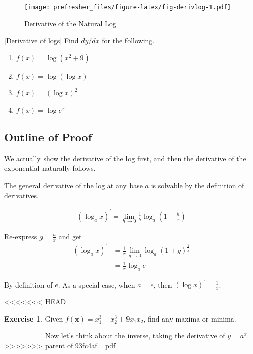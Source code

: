 \documentclass[]{book}
\providecommand{\tightlist}{%
  \setlength{\itemsep}{0pt}\setlength{\parskip}{0pt}}
\theoremstyle{definition}
\theoremstyle{definition}
\theoremstyle{definition}
\newtheorem{exercise}{Exercise}[chapter]
\theoremstyle{remark}
\begin{document}
\begin{figure}
\centering
\texttt{[image: prefresher\_files/figure-latex/fig-derivlog-1.pdf]}
\caption{\label{fig:fig-derivlog}Derivative of the Natural Log}
\end{figure}

[Derivative of logs]
\protect\hypertarget{exm:exmderivlog}{}{\label{exm:exmderivlog} {} }Find \(dy/dx\) for the following.

\begin{enumerate}
\def\labelenumi{\arabic{enumi}.}
\tightlist
\item
  \(f(x)=\log(x^2+9)\)
\item
  \(f(x)=\log(\log x)\)
\item
  \(f(x)=(\log x)^2\)
\item
  \(f(x)=\log e^x\)
\end{enumerate}

\hypertarget{outline-of-proof}{%
\subsection*{Outline of Proof}\label{outline-of-proof}}

We actually show the derivative of the log first, and then the derivative of the exponential naturally follows.

The general derivative of the log at any base \(a\) is solvable by the definition of derivatives.

\begin{align*}
(\log_a x)^\prime = \lim\limits_{h\to 0} \frac{1}{h}\log_{a}\left(1 + \frac{h}{x}\right)
\end{align*}

Re-express \(g = \frac{h}{x}\) and get
\begin{align*}
(\log_a x)^\prime &= \frac{1}{x}\lim_{g\to 0}\log_{a} (1 + g)^{\frac{1}{g}}\\
&= \frac{1}{x}\log_a e
\end{align*}

By definition of \(e\). As a special case, when \(a = e\), then \((\log x)^\prime = \frac{1}{x}\).

<<<<<<< HEAD
\begin{exercise}
\protect\hypertarget{exr:unnamed-chunk-59}{}{\label{exr:unnamed-chunk-59} }Given \(f(\mathbf{x})=x_1^3-x_2^3+9x_1x_2\), find any maxima or minima.
\end{exercise}
=======
Now let's think about the inverse, taking the derivative of \(y = a^x\).
>>>>>>> parent of 93fc4af... pdf
\end{document}
